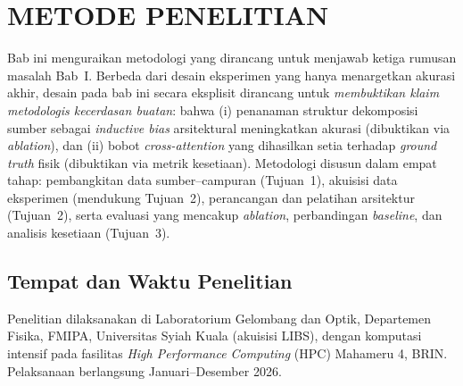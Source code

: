 
\chapter{METODE PENELITIAN}

Bab ini menguraikan metodologi yang dirancang untuk menjawab ketiga rumusan masalah Bab~I. Berbeda dari desain eksperimen yang hanya menargetkan akurasi akhir, desain pada bab ini secara eksplisit dirancang untuk \emph{membuktikan klaim metodologis kecerdasan buatan}: bahwa (i) penanaman struktur dekomposisi sumber sebagai \textit{inductive bias} arsitektural meningkatkan akurasi (dibuktikan via \textit{ablation}), dan (ii) bobot \textit{cross-attention} yang dihasilkan setia terhadap \textit{ground truth} fisik (dibuktikan via metrik kesetiaan). Metodologi disusun dalam empat tahap: pembangkitan data sumber--campuran (Tujuan~1), akuisisi data eksperimen (mendukung Tujuan~2), perancangan dan pelatihan arsitektur (Tujuan~2), serta evaluasi yang mencakup \textit{ablation}, perbandingan \textit{baseline}, dan analisis kesetiaan (Tujuan~3).

\section{Tempat dan Waktu Penelitian}
Penelitian dilaksanakan di Laboratorium Gelombang dan Optik, Departemen Fisika, FMIPA, Universitas Syiah Kuala (akuisisi LIBS), dengan komputasi intensif pada fasilitas \textit{High Performance Computing} (HPC) Mahameru 4, BRIN. Pelaksanaan berlangsung Januari--Desember 2026.

